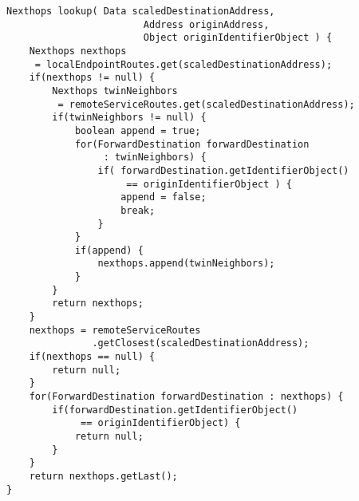 \javalisting
\begin{minipage}{\linewidth}
\begin{lstlisting}[caption={Routing im \gls*{cnt} (Java)},captionpos=b]
Nexthops lookup( Data scaledDestinationAddress,
						Address originAddress,
						Object originIdentifierObject ) {
	Nexthops nexthops
	 = localEndpointRoutes.get(scaledDestinationAddress);
	if(nexthops != null) {
		Nexthops twinNeighbors
		 = remoteServiceRoutes.get(scaledDestinationAddress);
		if(twinNeighbors != null) {
			boolean append = true;
			for(ForwardDestination forwardDestination
				 : twinNeighbors) {
				if( forwardDestination.getIdentifierObject()
					 == originIdentifierObject ) {
					append = false;
					break;
				}
			}
			if(append) {
				nexthops.append(twinNeighbors);
			}
		}
		return nexthops;
	}
	nexthops = remoteServiceRoutes
			   .getClosest(scaledDestinationAddress);
	if(nexthops == null) {
		return null;
	}
	for(ForwardDestination forwardDestination : nexthops) {
		if(forwardDestination.getIdentifierObject()
			 == originIdentifierObject) {
			return null;
		}
	}
	return nexthops.getLast();
}
\end{lstlisting}
\end{minipage}

